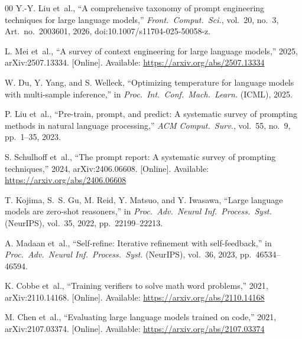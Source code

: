 \documentclass[conference]{IEEEtran}
\begin{document}
\begin{thebibliography}{00}
 Y.-Y. Liu et~al., ``A comprehensive taxonomy of prompt
engineering techniques for large language models,'' \emph{Front.\
Comput.\ Sci.}, vol.~20, no.~3, Art.~no.~2003601, 2026,
doi:10.1007/s11704-025-50058-z.

 L. Mei et~al., ``A survey of context engineering for
large language models,'' 2025, arXiv:2507.13334. [Online]. Available:
\url{https://arxiv.org/abs/2507.13334}

 W. Du, Y. Yang, and S. Welleck, ``Optimizing temperature
for language models with multi-sample inference,'' in \emph{Proc.\
Int.\ Conf.\ Mach.\ Learn.} (ICML), 2025.

 P. Liu et~al., ``Pre-train, prompt, and predict: A
systematic survey of prompting methods in natural language
processing,'' \emph{ACM Comput.\ Surv.}, vol.~55, no.~9, pp.~1--35,
2023.

 S. Schulhoff et~al., ``The prompt report: A systematic
survey of prompting techniques,'' 2024, arXiv:2406.06608. [Online].
Available: \url{https://arxiv.org/abs/2406.06608}

 T. Kojima, S.~S. Gu, M. Reid, Y. Matsuo, and Y. Iwasawa,
``Large language models are zero-shot reasoners,'' in \emph{Proc.\
Adv.\ Neural Inf.\ Process.\ Syst.} (NeurIPS), vol.~35, 2022,
pp.~22199--22213.

\bibitem{b12} A. Madaan et~al., ``Self-refine: Iterative refinement
with self-feedback,'' in \emph{Proc.\ Adv.\ Neural Inf.\ Process.\
Syst.} (NeurIPS), vol.~36, 2023, pp.~46534--46594.

\bibitem{b18} K. Cobbe et~al., ``Training verifiers to solve math
word problems,'' 2021, arXiv:2110.14168. [Online]. Available:
\url{https://arxiv.org/abs/2110.14168}

\bibitem{b20} M. Chen et~al., ``Evaluating large language models
trained on code,'' 2021, arXiv:2107.03374. [Online]. Available:
\url{https://arxiv.org/abs/2107.03374}

\end{thebibliography}

\vspace{12pt}
\end{document}

